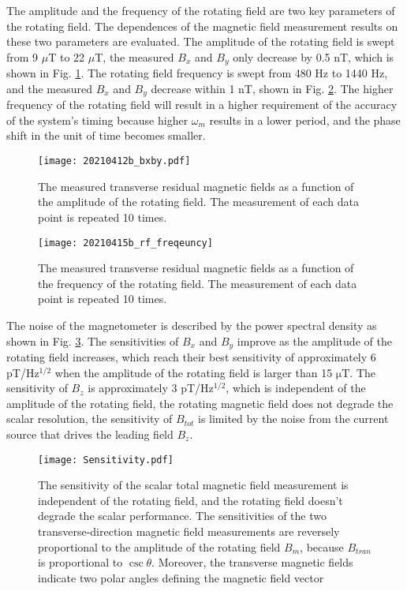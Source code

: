 \documentclass[prx,twocolumn,10pt,nofootinbib]{revtex4-1}
\begin{document}
The amplitude and the frequency of the rotating field are two key parameters of the rotating field. The dependences of the magnetic field measurement results on these two parameters are evaluated. The amplitude of the rotating field is swept from 9 $\mu$T to 22 $\mu$T, the measured $B_x$ and $B_y$ only decrease by 0.5 nT, which is shown in Fig. \ref{fig:bxy_swep_amp}. The rotating field frequency is swept from 480 Hz to 1440 Hz, and the measured $B_x$ and $B_y$ decrease within 1 nT, shown in Fig. \ref{fig:bxy_swep_freq}. The higher frequency of the rotating field will result in a higher requirement of the accuracy of the system's timing because higher $\omega_m$ results in a lower period, and the phase shift in the unit of time becomes smaller.

\begin{figure}[H]
\centering
\texttt{[image: 20210412b\_bxby.pdf]}
\caption{The measured transverse residual magnetic fields as a function of the amplitude of the rotating field. The measurement of each data point is repeated 10 times.}
\label{fig:bxy_swep_amp}	
\end{figure}

\begin{figure}[H]
\centering
\texttt{[image: 20210415b\_rf\_freqeuncy]}
\caption{The measured transverse residual magnetic fields as a function of the frequency of the rotating field. The measurement of each data point is repeated 10 times.}
\label{fig:bxy_swep_freq}
\end{figure}

The noise of the magnetometer is described by the power spectral density as shown in Fig. \ref{fig:sensitivity}. The sensitivities of $B_x$ and $B_y$ improve as the amplitude of the rotating field increases, which reach their best sensitivity of approximately 6 pT/Hz$^{1/2}$ when the amplitude of the rotating field is larger than 15 $\mathrm{\mu T}$. The sensitivity of $B_z$ is approximately 3 pT/Hz$^{1/2}$, which is independent of the amplitude of the rotating field, the rotating magnetic field does not degrade the scalar resolution, the sensitivity of $B_{tot}$ is limited by the noise from the current source that drives the leading field $B_z$.

\begin{figure}[H]
\centering
\texttt{[image: Sensitivity.pdf]}
 \caption{The sensitivity of the scalar total magnetic field measurement is independent of the rotating field, and the rotating field doesn't degrade the scalar performance. The sensitivities of the two transverse-direction magnetic field measurements are reversely proportional to the amplitude of the rotating field $B_m$, because $B_{tran}$ is proportional to $\csc \theta$. Moreover, the transverse magnetic fields indicate two polar angles defining the magnetic field vector}
\label{fig:sensitivity}
\end{figure}
\end{document}
